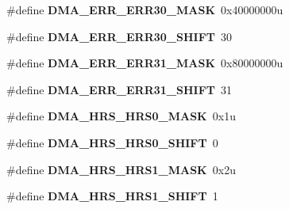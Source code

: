 \begin{DoxyCompactItemize}
\item 
\hypertarget{group___d_m_a___register___masks_gaaae0d47cf29f0aa3386f098c3b0c714b}{}\#define {\bfseries D\+M\+A\+\_\+\+E\+R\+R\+\_\+\+E\+R\+R30\+\_\+\+M\+A\+S\+K}~0x40000000u\label{group___d_m_a___register___masks_gaaae0d47cf29f0aa3386f098c3b0c714b}

\item 
\hypertarget{group___d_m_a___register___masks_gadf6dbecaac6ce13c626d798ad85900c5}{}\#define {\bfseries D\+M\+A\+\_\+\+E\+R\+R\+\_\+\+E\+R\+R30\+\_\+\+S\+H\+I\+F\+T}~30\label{group___d_m_a___register___masks_gadf6dbecaac6ce13c626d798ad85900c5}

\item 
\hypertarget{group___d_m_a___register___masks_ga622d3cfc491e0529a023a3f0edc8a0fa}{}\#define {\bfseries D\+M\+A\+\_\+\+E\+R\+R\+\_\+\+E\+R\+R31\+\_\+\+M\+A\+S\+K}~0x80000000u\label{group___d_m_a___register___masks_ga622d3cfc491e0529a023a3f0edc8a0fa}

\item 
\hypertarget{group___d_m_a___register___masks_ga65a44c8ef5c1673fc5537eae98a948c0}{}\#define {\bfseries D\+M\+A\+\_\+\+E\+R\+R\+\_\+\+E\+R\+R31\+\_\+\+S\+H\+I\+F\+T}~31\label{group___d_m_a___register___masks_ga65a44c8ef5c1673fc5537eae98a948c0}

\item 
\hypertarget{group___d_m_a___register___masks_ga39ace553ace4ea0f1da0f2e418ea1cc7}{}\#define {\bfseries D\+M\+A\+\_\+\+H\+R\+S\+\_\+\+H\+R\+S0\+\_\+\+M\+A\+S\+K}~0x1u\label{group___d_m_a___register___masks_ga39ace553ace4ea0f1da0f2e418ea1cc7}

\item 
\hypertarget{group___d_m_a___register___masks_ga68978d004a9c81063869d7d59553f3e9}{}\#define {\bfseries D\+M\+A\+\_\+\+H\+R\+S\+\_\+\+H\+R\+S0\+\_\+\+S\+H\+I\+F\+T}~0\label{group___d_m_a___register___masks_ga68978d004a9c81063869d7d59553f3e9}

\item 
\hypertarget{group___d_m_a___register___masks_ga260c7de3089f87d08b58f8c2874dcb2a}{}\#define {\bfseries D\+M\+A\+\_\+\+H\+R\+S\+\_\+\+H\+R\+S1\+\_\+\+M\+A\+S\+K}~0x2u\label{group___d_m_a___register___masks_ga260c7de3089f87d08b58f8c2874dcb2a}

\item 
\hypertarget{group___d_m_a___register___masks_ga33181a585c24a5532e4756d6f7080a74}{}\#define {\bfseries D\+M\+A\+\_\+\+H\+R\+S\+\_\+\+H\+R\+S1\+\_\+\+S\+H\+I\+F\+T}~1\label{group___d_m_a___register___masks_ga33181a585c24a5532e4756d6f7080a74}


\end{DoxyCompactItemize}
